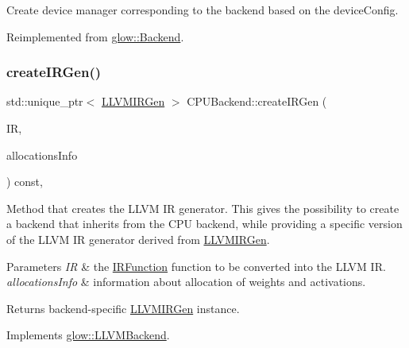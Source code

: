 Create device manager corresponding to the backend based on the device\+Config. 

Reimplemented from \hyperlink{classglow_1_1_backend_ab52ff7cc7a83edb282bea2cbf4b8766e}{glow\+::\+Backend}.

\mbox{\label{classglow_1_1_c_p_u_backend_a09cf2b220300c5cd9234e6476d3ab3df}} 
\subsubsection{\texorpdfstring{create\+I\+R\+Gen()}{createIRGen()}}
{\footnotesize\ttfamily std\+::unique\+\_\+ptr$<$ \hyperlink{classglow_1_1_l_l_v_m_i_r_gen}{L\+L\+V\+M\+I\+R\+Gen} $>$ C\+P\+U\+Backend\+::create\+I\+R\+Gen (\begin{DoxyParamCaption}\item[{const \hyperlink{classglow_1_1_i_r_function}{I\+R\+Function} $\ast$}]{IR,  }\item[{\hyperlink{structglow_1_1_allocations_info}{Allocations\+Info} \&}]{allocations\+Info }\end{DoxyParamCaption}) const\hspace{0.3cm}{\ttfamily [override]}, {\ttfamily [virtual]}}

Method that creates the L\+L\+VM IR generator. This gives the possibility to create a backend that inherits from the C\+PU backend, while providing a specific version of the L\+L\+VM IR generator derived from \hyperlink{classglow_1_1_l_l_v_m_i_r_gen}{L\+L\+V\+M\+I\+R\+Gen}. 
\begin{DoxyParams}{Parameters}
{\em IR} & the \hyperlink{classglow_1_1_i_r_function}{I\+R\+Function} function to be converted into the L\+L\+VM IR. \\
\hline
{\em allocations\+Info} & information about allocation of weights and activations. \\
\hline
\end{DoxyParams}
\begin{DoxyReturn}{Returns}
backend-\/specific \hyperlink{classglow_1_1_l_l_v_m_i_r_gen}{L\+L\+V\+M\+I\+R\+Gen} instance. 
\end{DoxyReturn}


Implements \hyperlink{classglow_1_1_l_l_v_m_backend_a10f19018bc4af0aecb2b68f4f532997c}{glow\+::\+L\+L\+V\+M\+Backend}.

